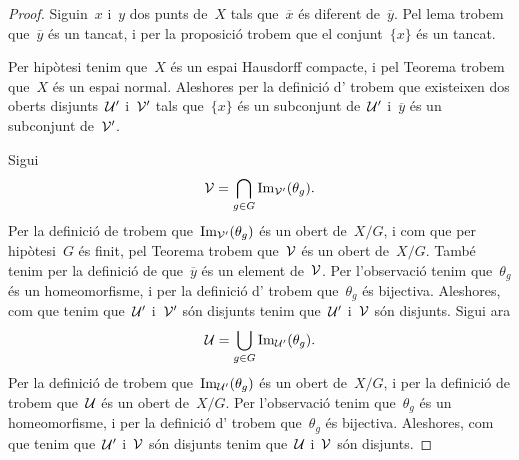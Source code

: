 \documentclass[../topologia.tex]{subfiles}
\begin{document}
    \begin{proof} %
        Siguin~\(x\) i~\(y\) dos punts de~\(X\) tals que~\(\overline{x}\) és diferent de~\(\overline{y}\).
        Pel lema  trobem que~\(\overline{y}\) és un tancat, i per la proposició  trobem que el conjunt~\(\{x\}\) és un tancat.

        Per hipòtesi tenim que~\(X\) és un espai Hausdorff compacte, i pel Teorema  trobem que~\(X\) és un espai normal.
        Aleshores per la definició d' trobem que existeixen dos oberts disjunts~\(\mathcal{U}'\) i~\(\mathcal{V}'\) tals que~\(\{x\}\) és un subconjunt de~\(\mathcal{U}'\) i~\(\overline{y}\) és un subconjunt de~\(\mathcal{V}'\).

        Sigui
        \[
            \mathcal{V}=\bigcap_{g\in G}\operatorname{Im}_{\mathcal{V}'}(\theta_{g}).
        \]
        Per la definició de  trobem que~\(\operatorname{Im}_{\mathcal{V}'}(\theta_{g})\) és un obert de~\(X/G\), i com que per hipòtesi~\(G\) és finit, pel Teorema  trobem que~\(\mathcal{V}\) és un obert de~\(X/G\).
        També tenim per la definició de  que~\(\overline{y}\) és un element de~\(\mathcal{V}\).
        Per l'observació  tenim que~\(\theta_{g}\) és un homeomorfisme, i per la definició d' trobem que~\(\theta_{g}\) és bijectiva.
        Aleshores, com que tenim que~\(\mathcal{U}'\) i~\(\mathcal{V}'\) són disjunts tenim que~\(\mathcal{U}'\) i~\(\mathcal{V}\) són disjunts.
        Sigui ara
        \[
            \mathcal{U}=\bigcup_{g\in G}\operatorname{Im}_{\mathcal{U}'}(\theta_{g}).
        \]
        Per la definició de  trobem que~\(\operatorname{Im}_{\mathcal{U}'}(\theta_{g})\) és un obert de~\(X/G\), i per la definició de  trobem que~\(\mathcal{U}\) és un obert de~\(X/G\).
        Per l'observació  tenim que~\(\theta_{g}\) és un homeomorfisme, i per la definició d' trobem que~\(\theta_{g}\) és bijectiva.
        Aleshores, com que tenim que~\(\mathcal{U}'\) i~\(\mathcal{V}\) són disjunts tenim que~\(\mathcal{U}\) i~\(\mathcal{V}\) són disjunts.


\end{proof}
\end{document}
